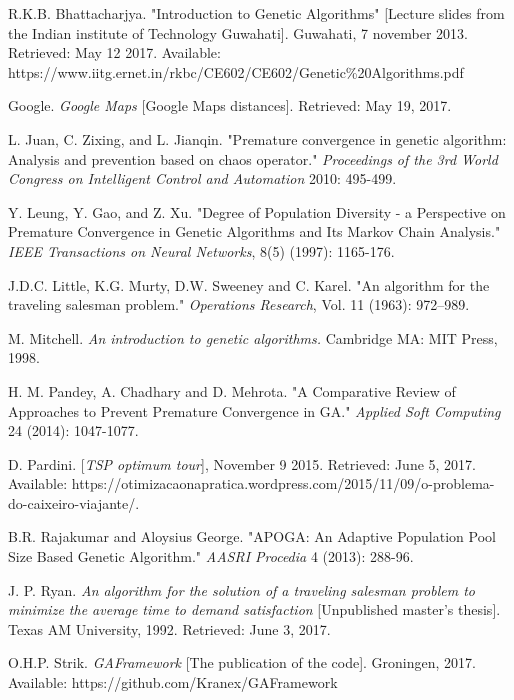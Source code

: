 \begin{thebibliography}{11}
R.K.B. Bhattacharjya.
"Introduction to Genetic Algorithms" [Lecture slides from the Indian institute of Technology Guwahati]. Guwahati, 7 november 2013. Retrieved: May 12 2017. Available: https://www.iitg.ernet.in/rkbc/CE602/CE602/Genetic\%20Algorithms.pdf

Google.
\textit{Google Maps} [Google Maps distances].
Retrieved: May 19, 2017.

L. Juan, C. Zixing, and L. Jianqin.
"Premature convergence in genetic algorithm: Analysis and prevention based on chaos operator."
\textit{Proceedings of the 3rd World Congress on Intelligent Control and Automation} 2010: 495-499.

Y. Leung, Y. Gao, and Z. Xu.
"Degree of Population Diversity - a Perspective on Premature Convergence in Genetic Algorithms and Its Markov Chain Analysis." \textit{IEEE Transactions on Neural Networks}, 8(5) (1997): 1165-176. 

J.D.C. Little, K.G. Murty, D.W. Sweeney and C. Karel. "An algorithm for the traveling salesman problem." \textit{Operations Research}, Vol. 11 (1963): 972–989.

M. Mitchell.
\textit{ An introduction to genetic algorithms.} Cambridge MA: MIT Press, 1998.

H. M. Pandey, A. Chadhary and D. Mehrota.
"A Comparative Review of Approaches to Prevent Premature Convergence in GA." \textit{Applied Soft Computing} 24 (2014): 1047-1077. 

D. Pardini.
[\textit{TSP optimum tour}], November 9 2015. Retrieved: June 5, 2017. Available: https://otimizacaonapratica.wordpress.com/2015/11/09/o-problema-do-caixeiro-viajante/.

B.R. Rajakumar and Aloysius George. "APOGA: An Adaptive Population Pool Size Based Genetic Algorithm." \textit{AASRI Procedia} 4 (2013): 288-96.

J. P. Ryan.
\textit{An algorithm for the solution of a traveling salesman problem to minimize the average time to demand satisfaction} [Unpublished master's thesis]. Texas AM University, 1992. Retrieved: June 3, 2017.

O.H.P. Strik.
\textit{GAFramework} [The publication of the code]. 
Groningen, 2017. Available: https://github.com/Kranex/GAFramework
\end{thebibliography}


